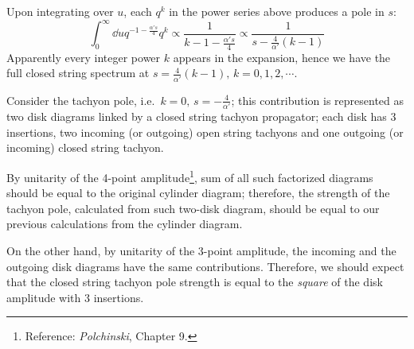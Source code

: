 \documentclass[a4paper,10pt]{article}
\begin{document}
\begin{enumerate}
\begin{enumerate}
	Upon integrating over $u$, each $q^k$ in the power series above produces a pole in $s$:
	\begin{equation}
		\int_0^\infty \dd{u}
			q^{
				-1 - \frac{\alpha's}{4}
			} q^k
		\propto \frac{1}{k - 1 - \frac{\alpha's}{4}}
		\propto \frac{1}{s - \frac{4}{\alpha'}(k-1)}
	\end{equation}
	Apparently every integer power $k$ appears in the expansion, hence we have the full closed string spectrum at $s = \frac{4}{\alpha'}(k-1),\,k=0,1,2,\cdots$. 
	
	\newparagraph
	Consider the tachyon pole, i.e.\ $
		k = 0,\,s = -\frac{4}{\alpha'}
	$; this contribution is represented as two disk diagrams linked by a closed string tachyon propagator; each disk has 3 insertions, two incoming (or outgoing) open string tachyons and one outgoing (or incoming) closed string tachyon. 
	
	By unitarity of the 4-point amplitude\footnote{
		Reference: \textit{Polchinski}, Chapter 9. 
	}, sum of all such factorized diagrams should be equal to the original cylinder diagram; therefore, the strength of the tachyon pole, calculated from such two-disk diagram, should be equal to our previous calculations from the cylinder diagram. 
	
	On the other hand, by unitarity of the 3-point amplitude, the incoming and the outgoing disk diagrams have the same contributions. Therefore, we should expect that the closed string tachyon pole strength is equal to the \textit{square} of the disk amplitude with 3 insertions. 
	

\end{enumerate}
\end{enumerate}
\end{document}
